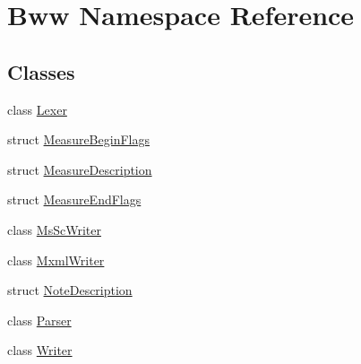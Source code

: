 \hypertarget{namespace_bww}{}\section{Bww Namespace Reference}
\label{namespace_bww}
\subsection*{Classes}
\begin{DoxyCompactItemize}
\item 
class \hyperlink{class_bww_1_1_lexer}{Lexer}
\item 
struct \hyperlink{struct_bww_1_1_measure_begin_flags}{Measure\+Begin\+Flags}
\item 
struct \hyperlink{struct_bww_1_1_measure_description}{Measure\+Description}
\item 
struct \hyperlink{struct_bww_1_1_measure_end_flags}{Measure\+End\+Flags}
\item 
class \hyperlink{class_bww_1_1_ms_sc_writer}{Ms\+Sc\+Writer}
\item 
class \hyperlink{class_bww_1_1_mxml_writer}{Mxml\+Writer}
\item 
struct \hyperlink{struct_bww_1_1_note_description}{Note\+Description}
\item 
class \hyperlink{class_bww_1_1_parser}{Parser}
\item 
class \hyperlink{class_bww_1_1_writer}{Writer}
\end{DoxyCompactItemize}
